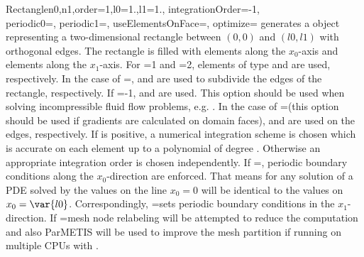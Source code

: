 \begin{funcdesc}{Rectangle}{n0,n1,order=1,l0=1.,l1=1., integrationOrder=-1, \\
  periodic0=\False, periodic1=\False, useElementsOnFace=\False, optimize=\False}
generates a \Domain object representing a two-dimensional rectangle between
$(0,0)$ and $(l0,l1)$ with orthogonal edges.
The rectangle is filled with  elements along the $x_0$-axis and
 elements along the $x_1$-axis.
For =1 and =2, elements of type  and
 are used, respectively.
In the case of =\False,  and
 are used to subdivide the edges of the rectangle, respectively.
If =-1,  and 
are used. This option should be used when solving incompressible fluid flow
problems, e.g. .
In the case of =\True (this option should be used if
gradients are calculated on domain faces),  and
 are used on the edges, respectively.
If  is positive, a numerical integration scheme is chosen
which is accurate on each element up to a polynomial of degree
.
Otherwise an appropriate integration order is chosen independently.
If =\True, periodic boundary conditions
along the $x_0$-direction are enforced.
That means for any solution of a PDE solved by \finley the values on the line
$x_0=0$ will be identical to the values on $x_0=\var{l0}$.
Correspondingly, =\True sets periodic boundary conditions in the
$x_1$-direction.
If =\True mesh node relabeling will be attempted to reduce the
computation and also ParMETIS will be used to improve the mesh partition if
running on multiple CPUs with \MPI.
\end{funcdesc}

